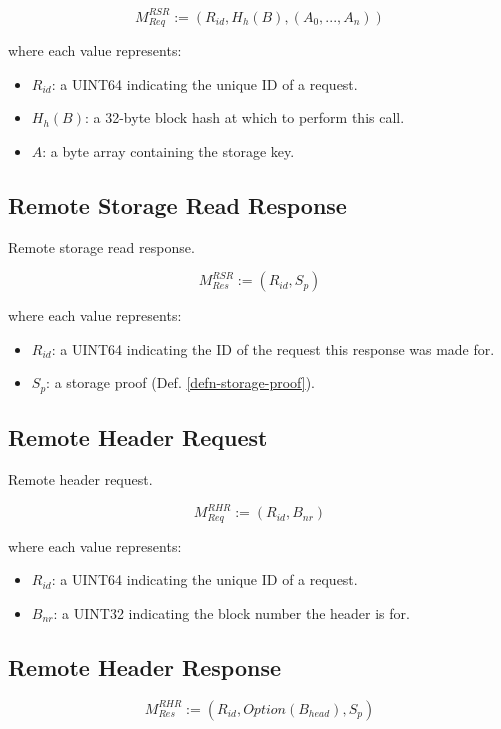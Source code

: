 \documentclass{book}
\begin{document}
\[
    M^{RSR}_{Req} := (R_{id}, H_h(B), (A_0, ..., A_n))
\]

where each value represents:

\begin{itemize}
    \item $R_{id}$: a UINT64 indicating the unique ID of a request.
    \item $H_h(B)$: a 32-byte block hash at which to perform this call.
    \item $A$: a byte array containing the storage key.
\end{itemize}

\subsection{Remote Storage Read Response}

Remote storage read response.

\[
    M^{RSR}_{Res} := (R_{id}, S_p)
\]

where each value represents:

\begin{itemize}
    \item $R_{id}$: a UINT64 indicating the ID of the request this response was
    made for.
    \item $S_p$: a storage proof (Def. \ref{defn-storage-proof}).
\end{itemize}

\subsection{Remote Header Request}

Remote header request.

\[
    M^{RHR}_{Req} := (R_{id}, B_{nr})
\]

where each value represents:

\begin{itemize}
    \item $R_{id}$: a UINT64 indicating the unique ID of a request.
    \item $B_{nr}$: a UINT32 indicating the block number the header is for.
\end{itemize}

\subsection{Remote Header Response}

\[
    M^{RHR}_{Res} := (R_{id}, Option(B_{head}), S_p)
\]
\end{document}
